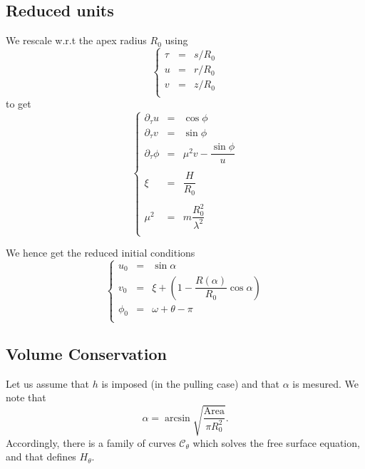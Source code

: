 \documentclass[aps,onecolumn]{revtex4}
\begin{document}
\subsection{Reduced units}
We rescale w.r.t the apex radius $R_0$ using
\begin{equation}
	\left\lbrace
	\begin{array}{rcl}
		\tau  & = & s/R_0 \\
		 u    & = & r/R_0 \\
		 v    & = & z/R_0 \\
	\end{array}
	\right.
\end{equation}
to get
\begin{equation}
	\left\lbrace
	\begin{array}{rcl}
	\partial_\tau u  & = & \cos\phi\\
	\partial_\tau v  & = & \sin\phi\\
	\partial_\tau \phi & = &  \mu^2 v - \dfrac{\sin\phi}{u}\\
	\\
	\xi            & = & \dfrac{H}{R_0}\\
	\\
	\mu^2                & = & m\dfrac{R_0^2}{\lambda^2}\\
	\end{array}
	\right.
\end{equation}

We hence get the reduced initial conditions
\begin{equation}
\left\lbrace
\begin{array}{rcl}
	u_0    & = & \sin\alpha\\
	v_0    & = & \xi + \left(1-\dfrac{R(\alpha)}{R_0}\cos\alpha\right)\\
	\phi_0 & = & \omega+\theta-\pi\\
\end{array}
\right.
\end{equation}

\subsection{Volume Conservation}
Let us assume that $h$ is imposed (in the pulling case) and that $\alpha$ is mesured.
We note that
\begin{equation}
	\alpha = \arcsin\sqrt{\dfrac{\mathrm{Area}}{\pi R_0^2}}.
\end{equation}
Accordingly, there is a family of curves $\mathcal{C}_\theta$ which solves the free surface equation,
and that defines $H_\theta$.
\end{document}
